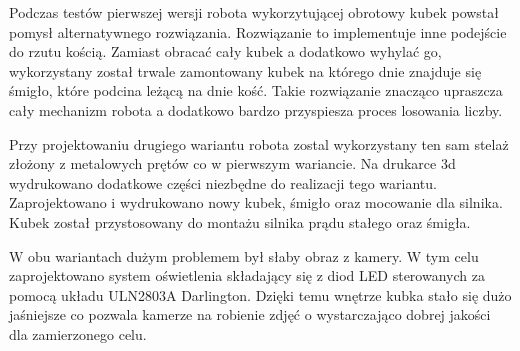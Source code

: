 Podczas testów pierwszej wersji robota wykorzytującej obrotowy kubek powstał pomysł alternatywnego rozwiązania.
Rozwiązanie to implementuje inne podejście do rzutu kością. Zamiast obracać cały kubek a dodatkowo wyhylać go,
wykorzystany został trwale zamontowany kubek na którego dnie znajduje się śmigło, które podcina leżącą na dnie kość.
Takie rozwiązanie znacząco upraszcza cały mechanizm robota a dodatkowo bardzo przyspiesza proces losowania liczby.

Przy projektowaniu drugiego wariantu robota zostal wykorzystany ten sam stelaż złożony z metalowych prętów co w 
pierwszym wariancie. Na drukarce 3d wydrukowano dodatkowe części niezbędne do realizacji tego wariantu.
Zaprojektowano i wydrukowano nowy kubek, śmigło oraz mocowanie dla silnika. Kubek został przystosowany do montażu 
silnika prądu stałego oraz śmigła. 

W obu wariantach dużym problemem był słaby obraz z kamery. W tym celu zaprojektowano system oświetlenia składający się z diod
LED sterowanych za pomocą układu ULN2803A Darlington. Dzięki temu wnętrze kubka stało się dużo jaśniejsze co pozwala kamerze na
robienie zdjęć o wystarczająco dobrej jakości dla zamierzonego celu. 





